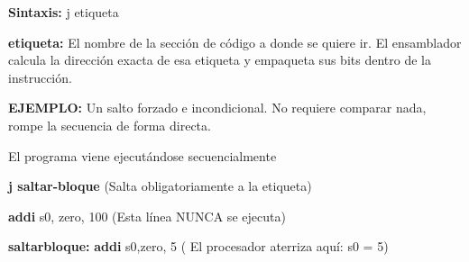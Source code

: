 \documentclass[12pt,a4paper]{article}
\begin{document}
\textbf{Sintaxis:} j etiqueta

\textbf{etiqueta:} El nombre de la sección de código a donde se quiere ir. El ensamblador calcula la dirección exacta de esa etiqueta y empaqueta sus bits dentro de la instrucción.

\textbf{EJEMPLO:}
Un salto forzado e incondicional. No requiere comparar nada, rompe la secuencia de forma directa.

El programa viene ejecutándose secuencialmente

\textbf{j saltar-bloque} (Salta obligatoriamente a la etiqueta)

\textbf{addi} s0, zero, 100 (Esta línea NUNCA se ejecuta)

\textbf{saltarbloque:}
    \textbf{addi} s0,zero, 5 ( El procesador aterriza aquí: s0 = 5)

\vspace{0.6cm}
\end{document}
